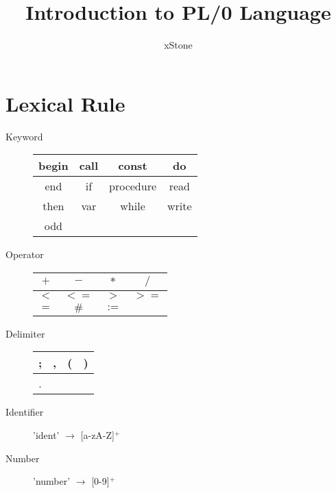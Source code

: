 \documentclass[11pt]{article}
\title{Introduction to PL/0 Language}
\author{xStone}
\begin{document}
\maketitle
\thispagestyle{fancy}

\section{Lexical Rule}
\begin{description}
 \item[Keyword]\hfill\begin{center}\setlength{\tabcolsep}{16pt}
                  \begin{tabular}{*{4}{|c}|}
				   \hline
				   begin	&call	&const		&do\\
				   \hline
				   end		&if		&procedure	&read\\
				   \hline
				   then		&var	&while		&write\\
				   \hline
				   odd		&		&			&\\
				   \hline
                  \end{tabular}
                 \end{center}
 \item[Operator]\hfil\begin{center}\setlength{\tabcolsep}{16pt}
                 \begin{tabular}{*{4}{|c}|}
                  \hline
                  $+$	&$-$	&$*$	&$/$\\
                  \hline
                  $<$	&$<=$	&$>$	&$>=$\\
                  \hline
                  $=$	&$\#$	&$:=$	&\\
                  \hline
                 \end{tabular}
                \end{center}
 \item[Delimiter]\hfil\begin{center}\setlength{\tabcolsep}{16pt}
                 \begin{tabular}{*{4}{|c}|}
                  \hline
                  ;		&,		&(		&)\\
                  \hline
                  .		&		&		&\\
                  \hline
                 \end{tabular}
                \end{center}
 \item[Identifier]\hfil\begin{center}
                 'ident' $\longrightarrow$ [a-zA-Z]$^+$
                 \end{center}
 \item[Number]\hfil\begin{center}
				'number' $\longrightarrow$ [0-9]$^+$
               \end{center}
\end{description}
	
\end{document}
